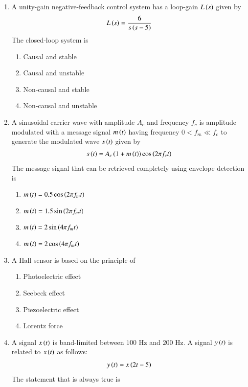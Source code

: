\documentclass[journal,12pt,onecolumn]{IEEEtran}
\theoremstyle{remark}
\begin{document}
\begin{enumerate}
\item A unity-gain negative-feedback control system has a loop-gain $L\left(s\right)$ given by
$$
L\left(s\right) = \frac{6}{s\left(s-5\right)}
$$
The closed-loop system is \underline{\hspace{2cm}}

\hfill{}
\begin{enumerate}
\item Causal and stable
\item Causal and unstable
\item Non-causal and stable
\item Non-causal and unstable
\end{enumerate}

\item A sinusoidal carrier wave with amplitude $A_c$ and frequency $f_c$ is amplitude modulated with a message signal $m\left(t\right)$ having frequency $0 < f_m \ll f_c$ to generate the modulated wave $s\left(t\right)$ given by
$$
s\left(t\right) = A_c\left(1 + m\left(t\right)\right)\cos \left(2\pi f_c t\right)
$$
The message signal that can be retrieved completely using envelope detection is \underline{\hspace{2cm}}

\hfill{}
\begin{enumerate}
\item $m\left(t\right) = 0.5 \cos\left(2\pi f_m t\right)$
\item $m\left(t\right) = 1.5 \sin\left(2\pi f_m t\right)$
\item $m\left(t\right) = 2 \sin\left(4\pi f_m t\right)$
\item $m\left(t\right) = 2 \cos \left(4\pi f_m t\right)$
\end{enumerate}

\item A Hall sensor is based on the principle of \underline{\hspace{2cm}}

\hfill{}
\begin{enumerate}
\item Photoelectric effect
\item Seebeck effect
\item Piezoelectric effect
\item Lorentz force
\end{enumerate}

\item A signal $x\left(t\right)$ is band-limited between $100$ Hz and $200$ Hz. A signal $y\left(t\right)$ is related to $x\left(t\right)$ as follows:
$$
y\left(t\right) = x\left(2t - 5\right)
$$
The statement that is always true is \underline{\hspace{2cm}}


\end{enumerate}
\end{document}
